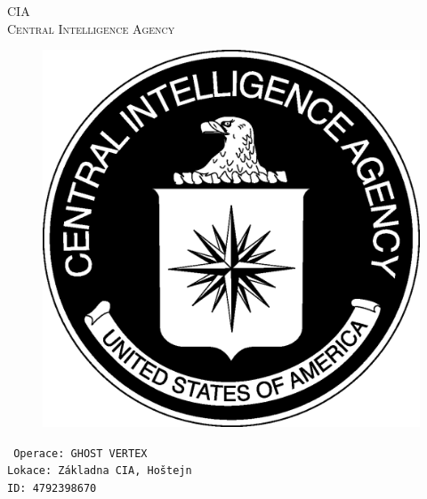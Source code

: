 \documentclass[a4paper, \fontheight]{article}
\begin{document}
	\begin{titlepage}
		\begin{center}		
			\textsc{{\fontsize{80}{0}\selectfont CIA}\\[2em]
				\Huge Central Intelligence Agency\\[2.5em]}
				
			\begin{figure}[H]
				\centering
				\includegraphics[scale=0.6]{sources/CIA_logo.eps}
			\end{figure}
		\end{center}	
		\vfill
		\noindent
		\texttt{\LARGE
				Operace: GHOST VERTEX\\[0.4em]
				Lokace: Základna CIA, Hoštejn\\[0.4em]
				ID: 4792398670}	
\end{titlepage} 
\end{document}
